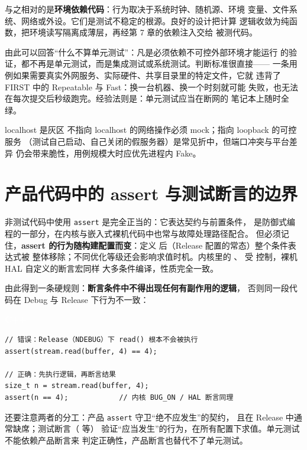 \documentclass[12pt,a4paper,fontset=fandol]{ctexbook}
\newcommand{\cpplabel}{%
  \begin{tcolorbox}[enhanced,colback=cppheadbg,colframe=cppheadbg,
    arc=1mm,boxrule=0mm,left=6pt,right=6pt,top=2pt,bottom=2pt,
    halign=left,oversize]
    \textcolor{white}{\small\bfseries C++}
  \end{tcolorbox}\vspace{-4pt}}
\begin{document}
与之相对的是\textbf{环境依赖代码}：行为取决于系统时钟、随机源、环境
变量、文件系统、网络或外设。它们是测试不稳定的根源。良好的设计把计算
逻辑收敛为纯函数，把环境读写隔离成薄层，再经第 7 章的依赖注入交给
被测代码。

由此可以回答“什么不算单元测试”：凡是必须依赖不可控外部环境才能运行
的验证，都不再是单元测试，而是集成测试或系统测试。判断标准很直接——
一条用例如果需要真实外网服务、实际硬件、共享目录里的特定文件，它就
违背了 FIRST 中的 Repeatable 与 Fast：换一台机器、换一个时刻就可能
失败，也无法在每次提交后秒级跑完。经验法则是：单元测试应当在断网的
笔记本上随时全绿。

\begin{note}{localhost 是灰区}
不指向 localhost 的网络操作必须 mock；指向 loopback 的可控服务
（测试自己启动、自己关闭的假服务器）是常见折中，但端口冲突与平台差异
仍会带来脆性，用例规模大时应优先进程内 Fake。
\end{note}

\section{产品代码中的 assert 与测试断言的边界}

非测试代码中使用 \texttt{assert} 是完全正当的：它表达契约与前置条件，
是防御式编程的一部分，在内核与嵌入式裸机代码中也常与故障处理路径配合。
但必须记住，\textbf{assert 的行为随构建配置而变}：定义
 后（Release 配置的常态）整个条件表达式被
整体移除；不同优化等级还会影响求值时机。内核里的
、 受
 控制，裸机 HAL 自定义的断言宏同样
大多条件编译，性质完全一致。

由此得到一条硬规则：\textbf{断言条件中不得出现任何有副作用的逻辑}，
否则同一段代码在 Debug 与 Release 下行为不一致：

\cpplabel
\begin{lstlisting}
// 错误：Release（NDEBUG）下 read() 根本不会被执行
assert(stream.read(buffer, 4) == 4);

// 正确：先执行逻辑，再断言结果
size_t n = stream.read(buffer, 4);
assert(n == 4);            // 内核 BUG_ON / HAL 断言同理
\end{lstlisting}

还要注意两者的分工：产品 \texttt{assert} 守卫“绝不应发生”的契约，
且在 Release 中通常缺席；测试断言（ 等）
验证“应当发生”的行为，在所有配置下求值。单元测试不能依赖产品断言来
判定正确性，产品断言也替代不了单元测试。
\end{document}
